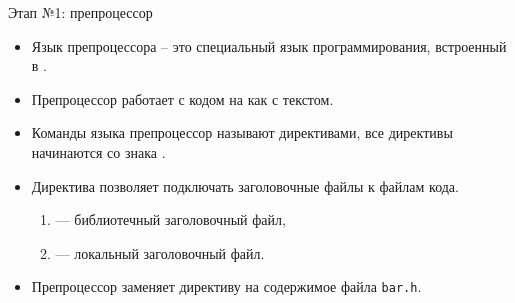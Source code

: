 \documentclass[aspectration=1610,t]{beamer}
\begin{document}
\begin{frame}[fragile]{Этап №1: препроцессор}
\begin{itemize}
    \item Язык препроцессора -- это специальный язык программирования, 
        встроенный в \langcpp.

    \item Препроцессор работает с кодом на \langcpp как с текстом.

    \item Команды языка препроцессор называют директивами,              
        все директивы начинаются со знака \code{\#}.

    \item Директива  позволяет подключать заголовочные файлы к файлам
        кода.
    \begin{enumerate}
        \item {} --- библиотечный заголовочный файл,
        \item {} --- локальный заголовочный файл.
    \end{enumerate}
    \item Препроцессор заменяет директиву  на содержимое
    файла \texttt{bar.h}.
\end{itemize}

%

\end{frame}
\end{document}
